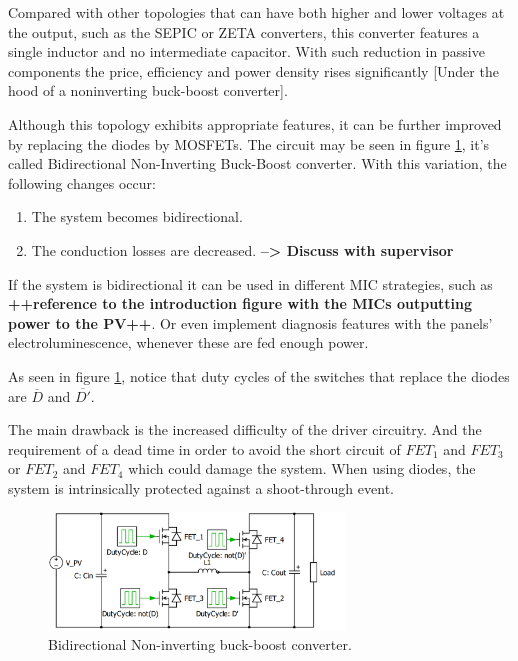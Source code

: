 \documentclass[11pt,a4paper]{report}
\begin{document}
\begin{center}
		Compared with other topologies that can have both higher and lower voltages at the output, such as the SEPIC or ZETA converters, this converter features a single inductor and no intermediate capacitor. With such reduction in passive components the price, efficiency and power density rises significantly [Under the hood of a
		noninverting buck-boost
		converter]. 
		
		Although this topology exhibits appropriate features, it can be further improved by replacing the diodes by MOSFETs. The circuit may be seen in figure \ref{BID_N_INV_BB_SCHEMATIC}, it's called Bidirectional Non-Inverting Buck-Boost converter. With this variation, the following changes occur:
		\begin{enumerate}
			\item The system becomes bidirectional.
			\item The conduction losses are decreased. \textbf{--> Discuss with supervisor}
		\end{enumerate}
	
		If the system is bidirectional it can be used in different MIC strategies, such as \textbf{ ++reference to the introduction figure with the MICs outputting power to the PV++}. Or even implement diagnosis features with the panels' electroluminescence, whenever these are fed enough power. 
		
		
		As seen in figure \ref{BID_N_INV_BB_SCHEMATIC}, notice that duty cycles of the switches that replace the diodes are $\overline{D}$ and $\overline{D'}$.
		
		
		The main drawback is the increased difficulty of the driver circuitry. And the requirement of a dead time in order to avoid the short circuit of $FET_1$ and $FET_3$ or $FET_2$ and $FET_4$ which could damage the system. When using diodes, the system is intrinsically protected against a shoot-through event. 	
		
		
	
	\begin{figure}
		\includegraphics[width=0.7\textwidth]{BID_H_B_BB}
		\caption{Bidirectional Non-inverting buck-boost converter.}
		\label{BID_N_INV_BB_SCHEMATIC}
	\end{figure}
		

	\end{center}
\end{document}
